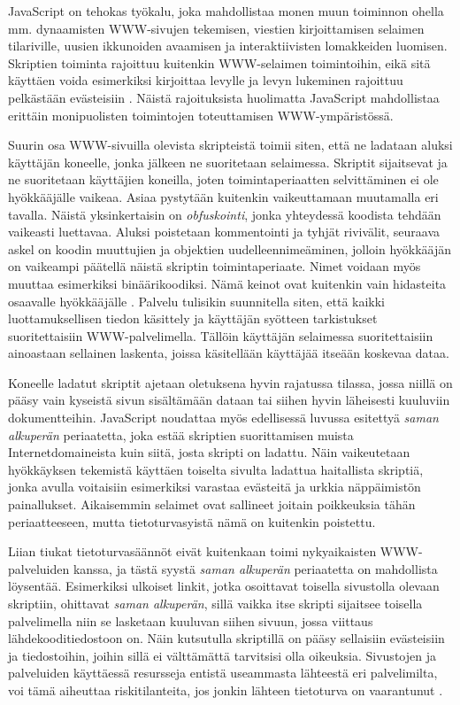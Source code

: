 JavaScript on tehokas työkalu, joka mahdollistaa monen muun toiminnon ohella mm. dynaamisten WWW-sivujen tekemisen, viestien kirjoittamisen selaimen tilariville, uusien ikkunoiden
avaamisen ja interaktiivisten lomakkeiden luomisen. Skriptien toiminta rajoittuu kuitenkin WWW-selaimen toimintoihin, eikä sitä käyttäen voida esimerkiksi kirjoittaa levylle ja levyn 
lukeminen rajoittuu pelkästään evästeisiin \cite{JavaScript}. Näistä rajoituksista huolimatta JavaScript mahdollistaa erittäin monipuolisten toimintojen toteuttamisen WWW-ympäristössä.

Suurin osa WWW-sivuilla olevista skripteistä toimii siten, että ne ladataan aluksi käyttäjän koneelle, jonka jälkeen ne suoritetaan selaimessa. Skriptit sijaitsevat ja ne suoritetaan 
käyttäjien koneilla, joten toimintaperiaatten selvittäminen ei ole hyökkääjälle vaikeaa. Asiaa pystytään kuitenkin vaikeuttamaan muutamalla eri tavalla. Näistä yksinkertaisin on 
\emph{obfuskointi}, jonka yhteydessä koodista tehdään vaikeasti luettavaa. Aluksi poistetaan kommentointi ja tyhjät rivivälit, seuraava askel on koodin muuttujien ja objektien
uudelleennimeäminen, jolloin hyökkääjän on vaikeampi päätellä näistä skriptin toimintaperiaate. Nimet voidaan myös muuttaa esimerkiksi binäärikoodiksi. Nämä keinot ovat kuitenkin 
vain hidasteita osaavalle hyökkääjälle \cite{AJAX}. Palvelu tulisikin suunnitella siten, että kaikki luottamuksellisen tiedon käsittely ja käyttäjän syötteen tarkistukset suoritettaisiin
WWW-palvelimella. Tällöin käyttäjän selaimessa suoritettaisiin ainoastaan sellainen laskenta, joissa käsitellään käyttäjää itseään koskevaa dataa.

Koneelle ladatut skriptit ajetaan oletuksena hyvin rajatussa tilassa, jossa niillä on pääsy vain kyseistä sivun sisältämään dataan tai siihen hyvin läheisesti kuuluviin dokumentteihin. 
JavaScript noudattaa myös  edellisessä luvussa esitettyä \emph{saman alkuperän} periaatetta, joka estää skriptien suorittamisen muista Internetdomaineista kuin siitä, josta skripti on
ladattu. Näin vaikeutetaan hyökkäyksen tekemistä käyttäen toiselta sivulta ladattua haitallista skriptiä, jonka avulla voitaisiin esimerkiksi varastaa evästeitä ja urkkia näppäimistön
painallukset.  Aikaisemmin selaimet ovat sallineet joitain poikkeuksia tähän periaatteeseen, mutta tietoturvasyistä nämä on kuitenkin poistettu.

Liian tiukat tietoturvasäännöt eivät 
kuitenkaan toimi nykyaikaisten WWW-pal\-ve\-lui\-den kanssa, ja tästä syystä \emph{saman alkuperän} periaatetta on mahdollista löysentää. Esimerkiksi ulkoiset linkit, jotka osoittavat toisella
sivustolla olevaan skriptiin, ohittavat \emph{saman alkuperän}, sillä vaikka itse skripti sijaitsee toisella palvelimella niin se lasketaan kuuluvan siihen sivuun, jossa viittaus
lähdekooditiedostoon on.  Näin kutsutulla skriptillä on pääsy sellaisiin evästeisiin ja tiedostoihin, joihin sillä ei välttämättä tarvitsisi olla oikeuksia. Sivustojen ja palveluiden 
käyttäessä resursseja entistä useammasta lähteestä eri palvelimilta, voi tämä aiheuttaa riskitilanteita, jos jonkin lähteen tietoturva on vaarantunut \cite{AJAX}.

